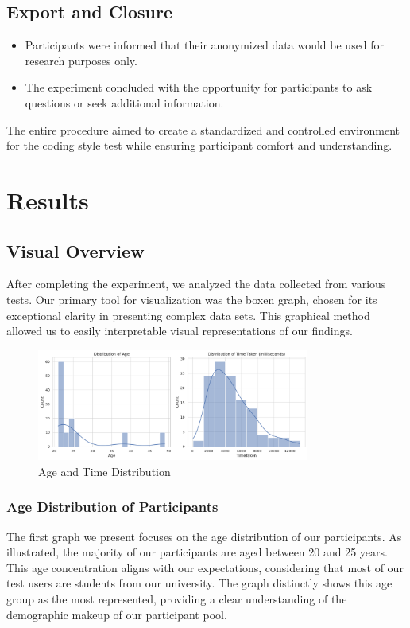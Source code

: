 \documentclass{article}
\begin{document}
\subsection*{Export and Closure}

\begin{itemize}
  \item Participants were informed that their anonymized data would be used for research purposes only.
  \item The experiment concluded with the opportunity for participants to ask questions or seek additional information.
\end{itemize}

The entire procedure aimed to create a standardized and controlled environment for the coding style test while ensuring participant comfort and understanding.


\section{Results}
\subsection{Visual Overview}

After completing the experiment, we analyzed the data collected from various tests. Our primary tool for visualization was the boxen graph, chosen for its exceptional clarity in presenting complex data sets. This graphical method allowed us to easily interpretable visual representations of our findings.

\begin{figure}[H]
    \centering
    \includegraphics[width=0.8\textwidth]{distribution_age.png}
    \caption{Age and Time Distribution}
\end{figure}

\subsubsection*{Age Distribution of Participants}
The first graph we present focuses on the age distribution of our participants. As illustrated, the majority of our participants are aged between 20 and 25 years. This age concentration aligns with our expectations, considering that most of our test users are students from our university. The graph distinctly shows this age group as the most represented, providing a clear understanding of the demographic makeup of our participant pool.
\end{document}
